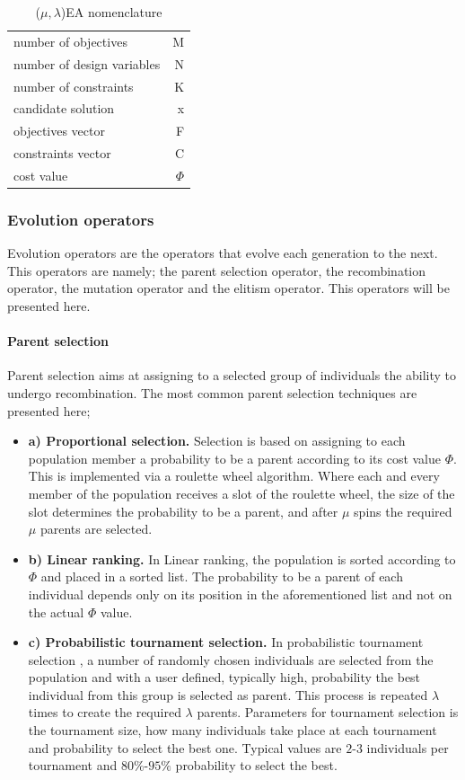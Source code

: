 \begin{table}[htdp]
\centering
\begin{tabular}{lr} 
\hline
\hline
number of objectives & M\\
number of design variables & N\\
number of constraints   & K\\
\hline
candidate solution   & x\\
objectives vector  & F\\
constraints vector  & C\\
cost value & $\Phi$ \\
\hline
\hline
\end{tabular}
\caption[GEA nomenclature]{($\mu,\lambda$)EA nomenclature}
\label{GEA nomenclature} 
\end{table}


\subsubsection{Evolution operators}
Evolution operators are the operators that evolve each generation to the next. This operators are namely; the parent selection operator, the recombination operator, the mutation operator and the elitism operator. This operators will be presented here.
   
\paragraph{Parent selection}
Parent selection aims at assigning to a selected group of individuals the ability to undergo recombination. The most common parent selection techniques are presented here; 
\begin{itemize}
\item[]{\bf a) Proportional selection.} Selection is based on assigning to each population member a probability to be a parent according to its cost value $\Phi$. This is implemented via a roulette wheel algorithm. Where each and every member of the population receives a slot of the roulette wheel, the size of the slot determines the probability to be a parent, and after $\mu$ spins the required $\mu$ parents are selected.  
\item[]{\bf b) Linear ranking.} In Linear ranking, the population is sorted according to $\Phi$ and placed in a sorted list. The probability to be a parent of each individual depends only on its position in the aforementioned list and not on the actual $\Phi$ value.
\item[]{\bf c) Probabilistic tournament selection.}
In probabilistic tournament selection \cite{goldberg1991}, a number of randomly chosen individuals are selected from the population and with a user defined, typically high, probability the best individual from this group is selected as parent. This process is repeated $\lambda$ times to create the required $\lambda$ parents. Parameters for tournament selection is the tournament size, how many individuals take place at each tournament and probability to select the best one. Typical values are $2$-$3$ individuals per tournament and $80\%$-$95\%$ probability to select the best.
\end{itemize}

